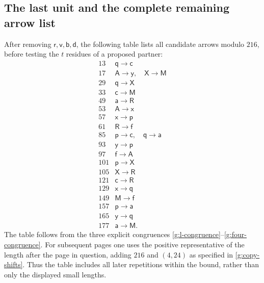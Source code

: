 \documentclass[11pt]{article}
\theoremstyle{definition}
\theoremstyle{remark}
\numberwithin{equation}{section}
\begin{document}
\subsection{The last unit and the complete remaining arrow list}

After removing $\mathsf r,\mathsf v,\mathsf b,\mathsf d$,
the following table lists all candidate arrows modulo
$216$, before testing the $t$ residues of a proposed
partner:
\begin{equation}\label{g:remaining-mod216}
\begin{array}{c|l}
13&\mathsf q\longrightarrow\mathsf c\\
17&\mathsf A\longrightarrow\mathsf y,\quad
   \mathsf X\longrightarrow\mathsf M\\
29&\mathsf q\longrightarrow\mathsf X\\
33&\mathsf c\longrightarrow\mathsf M\\
49&\mathsf a\longrightarrow\mathsf R\\
53&\mathsf A\longrightarrow\mathsf x\\
57&\mathsf x\longrightarrow\mathsf p\\
61&\mathsf R\longrightarrow\mathsf f\\
85&\mathsf p\longrightarrow\mathsf c,\quad
   \mathsf q\longrightarrow\mathsf a\\
93&\mathsf y\longrightarrow\mathsf p\\
97&\mathsf f\longrightarrow\mathsf A\\
101&\mathsf p\longrightarrow\mathsf X\\
105&\mathsf X\longrightarrow\mathsf R\\
121&\mathsf c\longrightarrow\mathsf R\\
129&\mathsf x\longrightarrow\mathsf q\\
149&\mathsf M\longrightarrow\mathsf f\\
157&\mathsf p\longrightarrow\mathsf a\\
165&\mathsf y\longrightarrow\mathsf q\\
177&\mathsf a\longrightarrow\mathsf M.
\end{array}
\end{equation}
The table follows from the three explicit congruences
\eqref{g:l-congruence}--\eqref{g:four-congruence}.
For subsequent pages one uses the positive representative
of the length after the page in question, adding $216$
and $(4,24)$ as specified in
\eqref{g:copy-shifts}.  Thus the table includes all
later repetitions within the bound, rather than only
the displayed small lengths.
\end{document}
